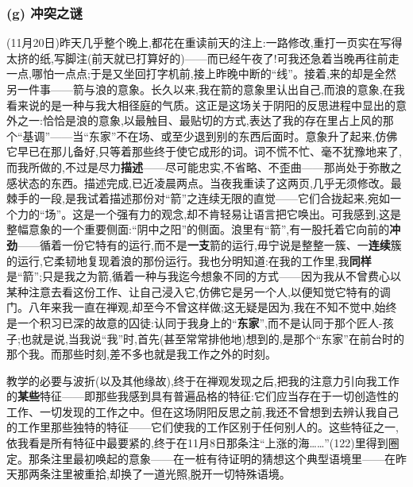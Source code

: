 \subsubsection*{(g) 冲突之谜}
\label{ch18:local:h41}

\label{ch18:local:n37}

\dmark{}(11月20日)昨天几乎整个晚上,都花在重读前天的注上:一路修改,重打一页实在写得太挤的纸,写脚注(前天就已打算好的)——而已经午夜了!可我还急着当晚再往前走一点,哪怕一点点;于是又坐回打字机前,接上昨晚中断的“线”。接着,来的却是全然另一件事——箭与浪的意象。长久以来,我在箭的意象里认出自己,而浪的意象,在我看来说的是一种与我大相径庭的气质。这正是这场关于阴阳的反思进程中显出的意外之一:恰恰是浪的意象,以最触目、最贴切的方式,表达了我的存在里占上风的那个“基调”——当“东家”不在场、或至少退到别的东西后面时。意象升了起来,仿佛它早已在那儿备好,只等着那些终于使它成形的词。词不慌不忙、毫不犹豫地来了,而我所做的,不过是尽力\textbf{描述}——尽可能忠实,不省略、不歪曲——那尚处于弥散之感状态的东西。描述完成,已近凌晨两点。当夜我重读了这两页,几乎无须修改。最棘手的一段,是我试着描述那份对“箭”之连续无限的直觉——它们合拢起来,宛如一个力的“场”。这是一个强有力的观念,却不肯轻易让语言把它唤出。可我感到,这是整幅意象的一个重要侧面:“阴中之阳”的侧面。浪里有“箭”,有一股托着它向前的\textbf{冲劲}——循着一份它特有的运行,而不是\textbf{一支}箭的运行,毋宁说是整整一簇、一\textbf{连续}簇的运行,它柔韧地复现着浪的那份运行。我也分明知道:在我的工作里,我\textbf{同样}是“箭”;只是我之为箭,循着一种与我迄今想象不同的方式——因为我从不曾费心以某种注意去看这份工作、让自己浸入它,仿佛它是另一个人,以便知觉它特有的调门。八年来我一直在禅观,却至今不曾这样做;这无疑是因为,我在不知不觉中,始终是一个积习已深的故意的囚徒:认同于我身上的“\textbf{东家}”,而不是认同于那个匠人-孩子;也就是说,当我说“我”时,首先(甚至常常排他地)想到的,是那个“东家”在前台时的那个我。而那些时刻,差不多也就是我工作之外的时刻。

教学的必要与波折(以及其他缘故),终于在禅观发现之后,把我的注意力引向我工作的\textbf{某些}特征——即那些我感到具有普遍品格的特征:它们应当存在于一切创造性的工作、一切发现的工作之中。但在这场阴阳反思之前,我还不曾想到去辨认我自己的工作里那些独特的特征——它们使我的工作区别于任何别人的。这些特征之一,依我看是所有特征中最要紧的,终于在11月8日那条注“上涨的海……”(122)里得到圈定。那条注里最初唤起的意象——在一桩有待证明的猜想这个典型语境里——在昨天那两条注里被重拾,却换了一道光照,脱开一切特殊语境。

